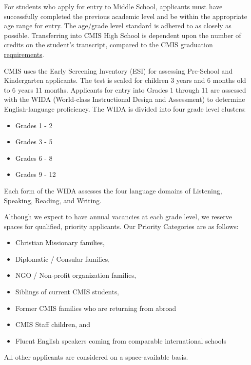 For students who apply for entry to Middle School, applicants must have successfully completed the previous academic level and be within the appropriate age range for entry.  The \href{http://cmis.ac.th/admissions}{age/grade level} standard is adhered to as closely as possible.  Transferring into CMIS High School is dependent upon the number of credits on the student's transcript, compared to the CMIS \href{http://cmis.ac.th/programs/high_school}{graduation requirements}.


CMIS uses the Early Screening Inventory (ESI) for assessing Pre-School and Kindergarten applicants.  The test is scaled for children 3 years and 6 months old to 6 years 11 months.  Applicants for entry into Grades 1 through 11 are assessed with the WIDA (World-class Instructional Design and Assessment) to determine English-language proficiency.  The WIDA is divided into four grade level clusters:

\begin{itemize}
\item Grades 1 - 2
\item Grades 3 - 5
\item Grades 6 - 8
\item Grades 9 - 12
\end{itemize}


Each form of the WIDA assesses the four language domains of Listening, Speaking, Reading, and Writing.  


Although we expect to have annual vacancies at each grade level, we reserve spaces for qualified, priority applicants.  Our Priority Categories are as follows:  
\begin{itemize}
\item Christian Missionary families,
\item Diplomatic / Consular families,
\item NGO / Non-profit organization families,
\item Siblings of current CMIS students,
\item Former CMIS families who are returning from abroad
\item CMIS Staff children, and
\item Fluent English speakers coming from comparable international schools
\end{itemize}

All other applicants are considered on a space-available basis.

